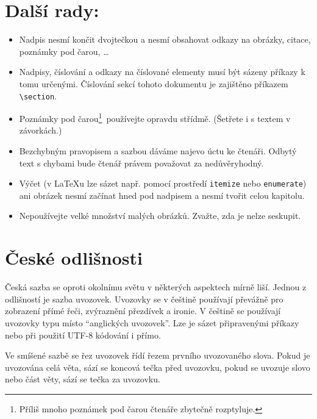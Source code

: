 \documentclass[a4paper, twocolumn, 10pt]{article}
\begin{document}
\section{Další rady:}

\begin{itemize}

\item Nadpis nesmí končit dvojtečkou a nesmí obsahovat odkazy na obrázky, citace, poznámky pod čarou, \dots

\item Nadpisy, číslování a odkazy na číslované elementy musí být sázeny příkazy k tomu určenými.
Číslování sekcí tohoto dokumentu je zajištěno příkazem \verb|\section|.

\item Poznámky pod čarou\footnote{Příliš mnoho poznámek pod čarou čtenáře zbytečně rozptyluje.}~používejte opravdu střídmě.
(Šetřete i s textem v závorkách.)

\item Bezchybným pravopisem a sazbou dáváme najevo úctu ke čtenáři.
Odbytý text s chybami bude čtenář právem považovat za nedůvěryhodný.

\item Výčet (v \LaTeX u lze sázet např. pomocí prostředí \texttt{itemize} nebo \texttt{enumerate}) ani obrázek nesmí začínat hned pod nadpisem a nesmí tvořit celou kapitolu.

\item Nepoužívejte velké množství malých obrázků.
Zvažte, zda je nelze seskupit.

\end{itemize}

\section{České odlišnosti}

Česká sazba se oproti okolnímu světu v některých aspektech mírně liší.
Jednou z odlišností je sazba uvozovek.
Uvozovky se v češtině používají převážně pro zobrazení přímé řeči, zvýraznění přezdívek a ironie.
V češtině se používají uvozovky typu  místo ``anglických uvozovek''.
Lze je sázet připravenými příkazy nebo při použití UTF-8 kódování i přímo.

Ve smíšené sazbě se řez uvozovek řídí řezem prvního uvozovaného slova.
Pokud je uvozována celá věta, sází se koncová tečka před uvozovku, pokud se uvozuje slovo nebo část věty, sází se tečka za uvozovku.
\end{document}
